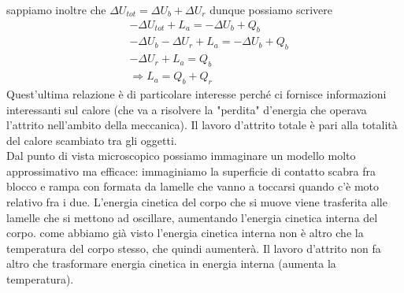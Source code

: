 \documentclass[
10pt, %
a4paper, %
oneside, %
headinclude,footinclude, %
BCOR5mm, %
]{scrartcl}
\begin{document}
sappiamo inoltre che $\Delta U_{tot} = \Delta U_b + \Delta U_r$ dunque possiamo scrivere
\begin{align*} 
	&-\Delta U_{tot} + L_a = - \Delta U_b + Q_b\\
	&-\Delta U_b - \Delta U_r+L_a =  - \Delta U_b + Q_b\\
	&- \Delta U_r+L_a =  Q_b\\
	&\Rightarrow L_a =  Q_b + Q_r
\end{align*} 
Quest'ultima relazione è di particolare interesse perché ci fornisce informazioni interessanti sul calore (che va a risolvere la "perdita" d'energia che operava l'attrito nell'ambito della meccanica). Il lavoro d'attrito totale è pari alla totalità del calore scambiato tra gli oggetti.\\
Dal punto di vista microscopico possiamo immaginare un modello molto approssimativo ma efficace: immaginiamo la superficie di contatto scabra fra blocco e rampa con formata da lamelle che vanno a toccarsi quando c'è moto relativo fra i due. L'energia cinetica del corpo che si muove viene trasferita alle lamelle che si mettono ad oscillare, aumentando l'energia cinetica interna del corpo. come abbiamo già visto l'energia cinetica interna non è altro che la temperatura del corpo stesso, che quindi aumenterà. Il lavoro d'attrito non fa altro che trasformare energia cinetica in energia interna (aumenta la temperatura). 
\newpage
\end{document}
